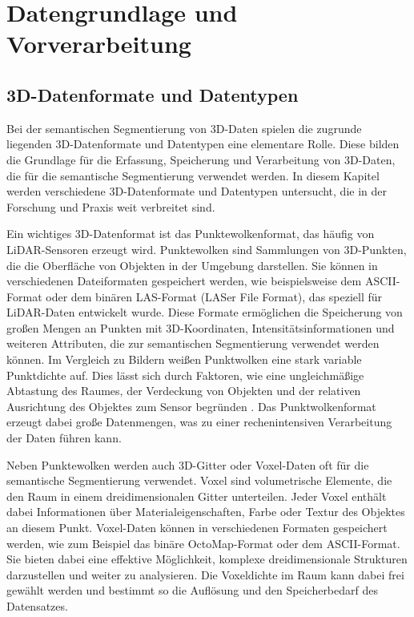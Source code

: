 \chapter{Datengrundlage und Vorverarbeitung}

\section{3D-Datenformate und Datentypen}
Bei der semantischen Segmentierung von 3D-Daten spielen die zugrunde liegenden
3D-Datenformate und Datentypen eine elementare Rolle. Diese bilden die
Grundlage für die Erfassung, Speicherung und Verarbeitung von 3D-Daten, die für
die semantische Segmentierung verwendet werden. In diesem Kapitel werden
verschiedene 3D-Datenformate und Datentypen untersucht, die in der Forschung
und Praxis weit verbreitet sind.

Ein wichtiges 3D-Datenformat ist das Punktewolkenformat, das häufig von
LiDAR-Sensoren erzeugt wird. Punktewolken sind Sammlungen von 3D-Punkten, die
die Oberfläche von Objekten in der Umgebung darstellen. Sie können in
verschiedenen Dateiformaten gespeichert werden, wie beispielsweise dem
ASCII-Format oder dem binären LAS-Format (LASer File Format), das speziell für
LiDAR-Daten entwickelt wurde. Diese Formate ermöglichen die Speicherung von
großen Mengen an Punkten mit 3D-Koordinaten, Intensitätsinformationen und
weiteren Attributen, die zur semantischen Segmentierung verwendet werden
können. Im Vergleich zu Bildern weißen Punktwolken eine stark variable
Punktdichte auf. Dies lässt sich durch Faktoren, wie eine ungleichmäßige
Abtastung des Raumes, der Verdeckung von Objekten und der relativen Ausrichtung
des Objektes zum Sensor begründen \cite{8578570}. Das Punktwolkenformat erzeugt dabei große
Datenmengen, was zu einer rechenintensiven Verarbeitung der Daten führen kann.

Neben Punktewolken werden auch 3D-Gitter oder Voxel-Daten oft für die
semantische Segmentierung verwendet. Voxel sind volumetrische Elemente, die den
Raum in einem dreidimensionalen Gitter unterteilen. Jeder Voxel enthält dabei
Informationen über Materialeigenschaften, Farbe oder Textur des Objektes an
diesem Punkt. Voxel-Daten können in verschiedenen Formaten gespeichert werden,
wie zum Beispiel das binäre OctoMap-Format oder dem ASCII-Format. Sie bieten
dabei eine effektive Möglichkeit, komplexe dreidimensionale Strukturen
darzustellen und weiter zu analysieren. Die Voxeldichte im Raum kann dabei frei
gewählt werden und bestimmt so die Auflösung und den Speicherbedarf des
Datensatzes.

